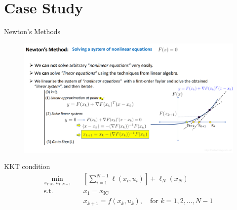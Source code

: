 \documentclass{beamer}
\begin{document}
\section{Case Study}
\begin{frame}{Newton's Methods}
\begin{figure}[htbp]  

    \centering

    \includegraphics[width=1\textwidth]{fig/newton_method.png}



\end{figure}
\end{frame}

\begin{frame}{KKT condition}
\[
\begin{aligned}
\min_{x_{1:N},\, u_{1:N-1}} \quad & \left[ \sum_{i=1}^{N-1} \ell(x_i, u_i) \right] + \ell_N(x_N) \\
\text{s.t.} \quad & x_1 = x_{\mathrm{IC}} \\
& x_{k+1} = f(x_k, u_k), \quad \text{for } k = 1,2,\ldots,N-1
\end{aligned}
\]    
\end{frame}
\end{document}
